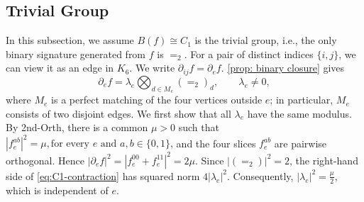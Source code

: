 \subsection{Trivial Group}\label{subsec: Trivial group}
In this subsection, we assume $B(f)\cong C_1$ is the trivial group, i.e., the only binary signature generated from $f$ is $=_2$.
For a pair of distinct indices $\{i,j\}$, we can view it as an edge in $K_6$.
We write $\partial_{ij}f=\partial_ef$.
\cref{prop: binary closure} gives
\begin{equation}
    \partial_e f
    =
    \lambda_e \bigotimes_{d\in M_e} (=_2)_d ,
    \qquad \lambda_e\neq 0,
    \label{eq:C1-contraction}
\end{equation}
where \(M_e\) is a perfect matching of the four vertices outside \(e\);
in particular, \(M_e\) consists of two disjoint edges.
We first show that all \(\lambda_e\) have the same modulus.  
By {\sc 2nd-Orth}, there is a common \(\mu>0\) such that
$
    |f_e^{ab}|^2=\mu,
    \text{for every \(e\) and \(a,b\in\{0,1\}\),}
$
and the four slices \(f_e^{ab}\) are pairwise orthogonal.  Hence
$
    |\partial_e f|^2
    =
    |f_e^{00}+f_e^{11}|^2
    =
    2\mu.
$
Since \(|(=_2)|^2=2\), the right-hand side of
\eqref{eq:C1-contraction} has squared norm \(4|\lambda_e|^2\).
Consequently,
$
    |\lambda_e|^2=\frac{\mu}{2},
$
which is independent of \(e\).


